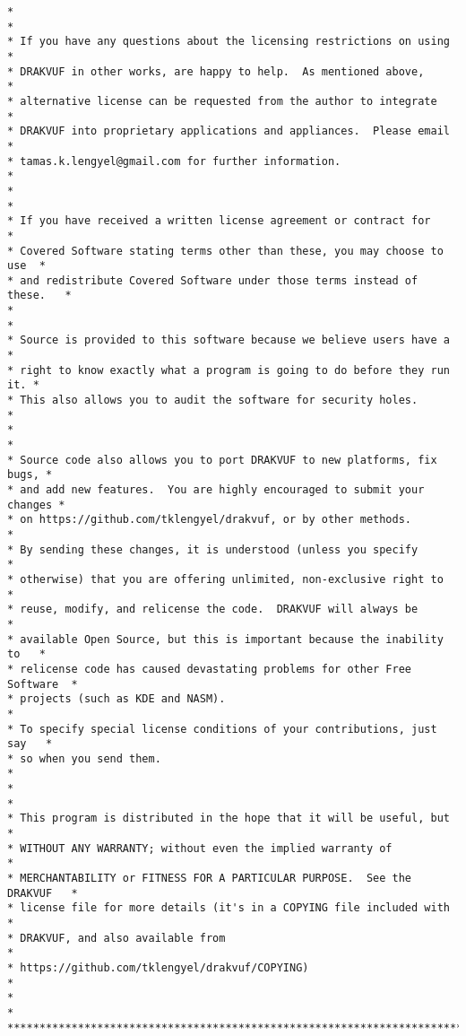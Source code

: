 \begin{lstlisting}[style=CStyle]
*                                                                         *
* If you have any questions about the licensing restrictions on using     *
* DRAKVUF in other works, are happy to help.  As mentioned above,         *
* alternative license can be requested from the author to integrate       *
* DRAKVUF into proprietary applications and appliances.  Please email     *
* tamas.k.lengyel@gmail.com for further information.                      *
*                                                                         *
* If you have received a written license agreement or contract for        *
* Covered Software stating terms other than these, you may choose to use  *
* and redistribute Covered Software under those terms instead of these.   *
*                                                                         *
* Source is provided to this software because we believe users have a     *
* right to know exactly what a program is going to do before they run it. *
* This also allows you to audit the software for security holes.          *
*                                                                         *
* Source code also allows you to port DRAKVUF to new platforms, fix bugs, *
* and add new features.  You are highly encouraged to submit your changes *
* on https://github.com/tklengyel/drakvuf, or by other methods.           *
* By sending these changes, it is understood (unless you specify          *
* otherwise) that you are offering unlimited, non-exclusive right to      *
* reuse, modify, and relicense the code.  DRAKVUF will always be          *
* available Open Source, but this is important because the inability to   *
* relicense code has caused devastating problems for other Free Software  *
* projects (such as KDE and NASM).                                        *
* To specify special license conditions of your contributions, just say   *
* so when you send them.                                                  *
*                                                                         *
* This program is distributed in the hope that it will be useful, but     *
* WITHOUT ANY WARRANTY; without even the implied warranty of              *
* MERCHANTABILITY or FITNESS FOR A PARTICULAR PURPOSE.  See the DRAKVUF   *
* license file for more details (it's in a COPYING file included with     *
* DRAKVUF, and also available from                                        *
* https://github.com/tklengyel/drakvuf/COPYING)                           *
*                                                                         *
***************************************************************************/


\end{lstlisting}
